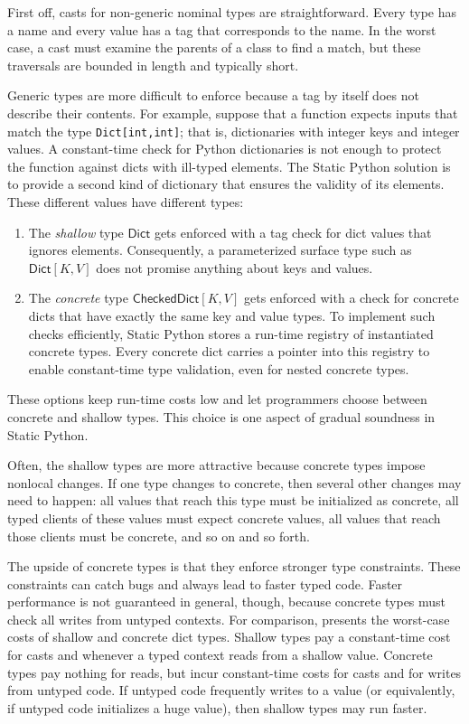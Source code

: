 \documentclass[english,cleveref,crc]{programming}
\newcommand{\SP}{Static Python}
\newcommand{\code}[1]{\texttt{#1}}
\newcommand{\typefont}[1]{\mathsf{#1}}
\newcommand{\paramtype}[2]{#1[#2]}
\newcommand{\sptrawpydict}{\typefont{Dict}}
\newcommand{\sptrawchkdict}{\typefont{CheckedDict}} %
\newcommand{\sptpydict}[2]{\paramtype{\sptrawpydict}{#1, #2}}
\newcommand{\sptchkdict}[2]{\paramtype{\sptrawchkdict}{#1, #2}}
\begin{document}
First off, casts for non-generic nominal types are straightforward.
Every type has a name and every value has a tag that corresponds to the name.
In the worst case, a cast must examine the parents of a class to find a match,
but these traversals are bounded in length and typically short.

Generic types are more difficult to enforce because a tag by itself does not
describe their contents.
For example, suppose that a function expects inputs that match
the type \code{Dict[int,int]}; that is, dictionaries with integer keys and
integer values.
A constant-time check for Python dictionaries is not enough to protect the
function against dicts with ill-typed elements.
The \SP{} solution is to provide a second kind of dictionary that ensures
the validity of its elements.
These different values have different types:
\begin{enumerate}
  \item
    The \emph{shallow} type $\sptrawpydict$ gets enforced with a tag check
    for dict values that ignores elements.
    Consequently, a parameterized surface type such as $\sptpydict{K}{V}$
    does not promise anything about keys and values.
  \item
    The \emph{concrete} type $\sptchkdict{K}{V}$ gets enforced with a
    check for concrete dicts that have exactly the same key and value
    types.
    To implement such checks efficiently, \SP{} stores a run-time registry
    of instantiated concrete types.
    Every concrete dict carries a pointer into this registry to enable
    constant-time type validation, even for nested concrete types.
\end{enumerate}
%
These options keep run-time costs low and let programmers choose between
concrete and shallow types.
This choice is one aspect of gradual soundness in \SP{}.

Often, the shallow types are more attractive because concrete types impose
nonlocal changes.
If one type changes to concrete, then several other changes may need to happen:
all values that reach this type must be initialized as concrete,
all typed clients of these values must expect concrete values,
all values that reach those clients must be concrete,
and so on and so forth.

The upside of concrete types is that they enforce stronger type constraints.
These constraints can catch bugs and always lead to faster typed code.
Faster performance is not guaranteed in general, though, because concrete types must
check all writes from untyped contexts.
For comparison,  presents the worst-case costs of
shallow and concrete dict types.
Shallow types pay a constant-time cost for casts
and whenever a typed context reads from a shallow value.
Concrete types pay nothing for reads, but incur constant-time costs
for casts and for writes from untyped code.
If untyped code frequently writes to a value
(or equivalently, if untyped code initializes a huge value),
then shallow types may run faster.
\end{document}
